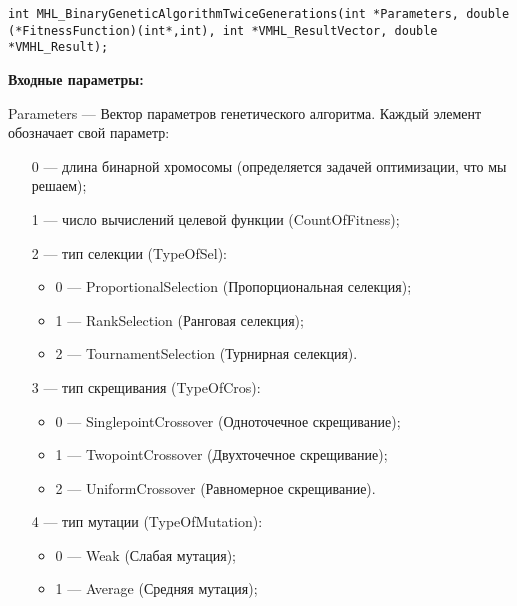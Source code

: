 \documentclass[a4paper,12pt]{article}
\begin{document}
\begin{lstlisting}[label=code_syntax_MHL_BinaryGeneticAlgorithmTwiceGenerations,caption=Синтаксис]
int MHL_BinaryGeneticAlgorithmTwiceGenerations(int *Parameters, double (*FitnessFunction)(int*,int), int *VMHL_ResultVector, double *VMHL_Result);
\end{lstlisting}

\textbf{Входные параметры:}
 
Parameters --- Вектор параметров генетического алгоритма. Каждый элемент обозначает свой параметр:
 
 \begin{itemize}
 \item [0] --- длина бинарной хромосомы (определяется задачей оптимизации, что мы решаем);
 
 \item [1] --- число вычислений целевой функции (CountOfFitness);
 
 \item [2] --- тип селекции (TypeOfSel):
 
 \begin{itemize}
       \item 0 --- ProportionalSelection (Пропорциональная селекция);
 
       \item 1 --- RankSelection (Ранговая селекция);
 
       \item 2 --- TournamentSelection (Турнирная селекция).
	    \end{itemize}
 
 \item [3] --- тип скрещивания (TypeOfCros):
  \begin{itemize}
       \item 0 --- SinglepointCrossover (Одноточечное скрещивание);
 
       \item 1 --- TwopointCrossover (Двухточечное скрещивание);
 
       \item 2 --- UniformCrossover (Равномерное скрещивание).
	    \end{itemize}
 
 \item [4] --- тип мутации (TypeOfMutation):
  \begin{itemize}
       \item 0 --- Weak (Слабая мутация);
 
       \item 1 --- Average (Средняя мутация);
 

\end{itemize}
\end{itemize}
\end{document}
